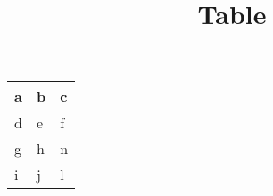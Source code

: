 \documentclass{article}
\title{Table}
\begin{document}
\maketitle
\begin{tabular}{ | l | l | l | }
\hline
a & b & c\\ \hline
d & e & f\\ \hline
g & h & n\\ \hline
i & j & l\\ \hline
\end{tabular}
\end{document}
